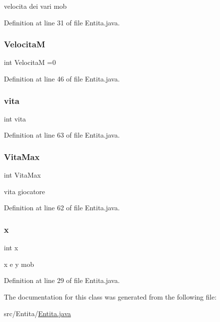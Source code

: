 velocita dei vari mob 

Definition at line 31 of file Entita.\+java.

\mbox{\label{class_entita_1_1_entita_a90a894e061963f9de7d3619983627ccc}} 
\subsubsection{\texorpdfstring{VelocitaM}{VelocitaM}}
{\footnotesize\ttfamily int VelocitaM =0}



Definition at line 46 of file Entita.\+java.

\mbox{\label{class_entita_1_1_entita_aa68a3a700682130e7af254a4b325f0cb}} 
\subsubsection{\texorpdfstring{vita}{vita}}
{\footnotesize\ttfamily int vita}



Definition at line 63 of file Entita.\+java.

\mbox{\label{class_entita_1_1_entita_adf6e8908b656fe5199ca043083e48615}} 
\subsubsection{\texorpdfstring{Vita\+Max}{VitaMax}}
{\footnotesize\ttfamily int Vita\+Max}

vita giocatore 

Definition at line 62 of file Entita.\+java.

\mbox{\label{class_entita_1_1_entita_a6150e0515f7202e2fb518f7206ed97dc}} 
\subsubsection{\texorpdfstring{x}{x}}
{\footnotesize\ttfamily int x}

x e y mob 

Definition at line 29 of file Entita.\+java.



The documentation for this class was generated from the following file\+:\begin{DoxyCompactItemize}
\item 
src/\+Entita/\hyperlink{_entita_8java}{Entita.\+java}\end{DoxyCompactItemize}

